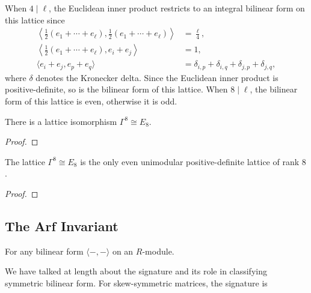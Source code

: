 When $4\mid \ell$, the Euclidean inner product restricts to an integral bilinear form on this lattice since
\[
	\begin{aligned}
		\left\langle \frac{1}{2}(e_1+\cdots+e_\ell), \frac{1}{2}(e_1+\cdots+e_\ell)\right\rangle & = \frac{\ell}{4},                                      \\
		\left\langle \frac{1}{2}(e_1+\cdots+e_\ell), e_i+e_j\right\rangle                        & = 1,                                                   \\
		\langle e_i+e_j, e_p +e_q\rangle                                                         & = \delta_{i,p}+\delta_{i,q}+\delta_{j,p}+\delta_{j,q},
	\end{aligned}
\]
where $\delta$ denotes the Kronecker delta. Since the Euclidean inner product is positive-definite, so is the bilinear form of this lattice. When $8\mid\ell$, the bilinear form of this lattice is even, otherwise it is odd. 

\begin{proposition}
	There is a lattice isomorphism $\Gamma^8\cong E_8$.
\end{proposition}
\begin{proof}
\end{proof}

\begin{theorem}[Mordell]
	The lattice $\Gamma^8\cong E_8$ is the only even unimodular positive-definite lattice of rank $8$.
\end{theorem}
\begin{proof}
\end{proof}

\begin{definition}
\end{definition}


\subsection{The Arf Invariant}\label{sec:arf-invariant}

For any bilinear form $\langle-,-\rangle$ on an $R$-module.


We have talked at length about the signature and its role in classifying symmetric bilinear form. For skew-symmetric matrices, the signature is 

\begin{definition}
\end{definition}

